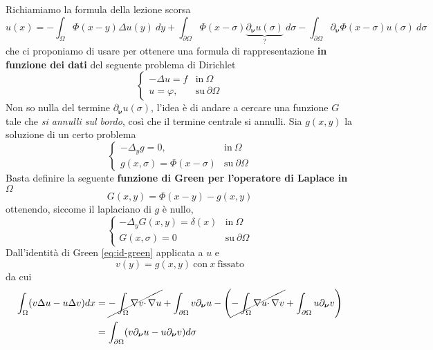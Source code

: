 \documentclass[10pt,a4paper,twoside,openright]{book}
\begin{document}
Richiamiamo la formula della lezione scorsa
\begin{equation}
	u( x) =-\int _{\Omega } \Phi ( x-y) \Delta u( y) \ dy+\int _{\partial \Omega } \Phi ( x-\sigma ) \underbrace{\partial _{\bm{\nu}} u( \sigma )}_{?} \ d\sigma -\int _{\partial \Omega } \partial _{\bm{\nu}} \Phi ( x-\sigma ) u( \sigma ) \ d\sigma 
	\label{eq:richiamo-formula-green}
\end{equation}
che ci proponiamo di usare per ottenere una formula di rappresentazione \textbf{in funzione dei dati} del seguente problema di Dirichlet
\begin{equation}
	\begin{cases}
		-\Delta u=f & \text{in} \ \Omega          \\
		u=\varphi , & \text{su} \ \partial \Omega 
	\end{cases}
	\label{eq:sol-green-pb-dirichlet}
\end{equation}
Non so nulla del termine $\partial _{\bm{\nu}} u( \sigma )$, l'idea è di andare a cercare una funzione $G$ tale che \textit{si annulli sul bordo}, così che il termine centrale si annulli. Sia $g(x,y)$ la soluzione di un certo problema
\begin{equation}
	\begin{cases}
		-\Delta _{y} g=0,                & \text{in} \ \Omega          \\
		g( x,\sigma ) =\Phi ( x-\sigma ) & \text{su} \ \partial \Omega 
	\end{cases}
	\label{eq:sol-green-pb-unico}
\end{equation}
Basta definire la seguente \textbf{funzione di Green per l'operatore di Laplace in} $\Omega $
\begin{equation*}
	\boxed{G( x,y) =\Phi ( x-y) -g( x,y)}
\end{equation*}
ottenendo, siccome il laplaciano di $g$ è nullo,
\begin{equation*}
	\begin{cases}
		-\Delta _{y} G( x,y) =\delta ( x) & \text{in} \ \Omega          \\
		G( x,\sigma ) =0                  & \text{su} \ \partial \Omega 
	\end{cases}
\end{equation*}
Dall'identità di Green \eqref{eq:id-green} applicata a $u$ e
\begin{equation}
	v( y) =g( x,y) \ \text{con} \ x\ \text{fissato}
	\label{eq:sol-green-v-g}
\end{equation}
da cui
\begin{align*}
	\int _{\Omega }( v\Delta u-u\Delta v) dx & =\cancel{-\int _{\Omega } \nabla v\cdotp \nabla u} +\int _{\partial \Omega } v\partial _{\bm{\nu}} u-\left(\cancel{-\int _{\Omega } \nabla u\cdotp \nabla v} +\int _{\partial \Omega } u\partial _{\bm{\nu}} v\right) \\
	 & =\int _{\partial \Omega }( v\partial _{\bm{\nu}} u-u\partial _{\bm{\nu}} v) d\sigma                                                                                                                                 
\end{align*}
\end{document}
